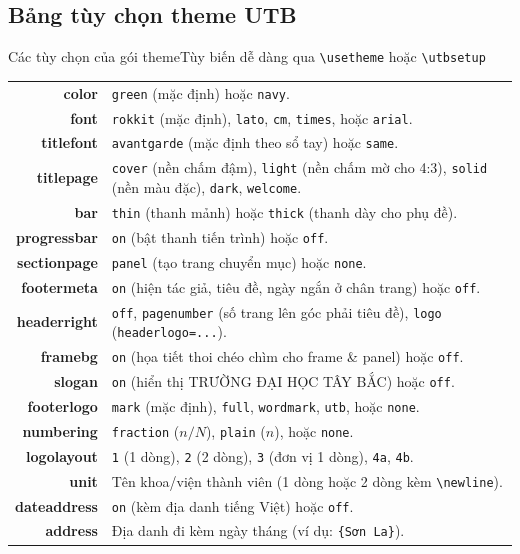 \documentclass[aspectratio=169,10pt]{beamer}
\begin{document}
\subsection{Bảng tùy chọn theme UTB}
\begin{frame}{Các tùy chọn của gói theme}{Tùy biến dễ dàng qua \texttt{\textbackslash usetheme} hoặc \texttt{\textbackslash utbsetup}}
  \scriptsize
  \centering
  \begin{tabularx}{\textwidth}{>{\ttfamily\bfseries\color{utbmain}}r >{\small}X}
    color       & \texttt{green} (mặc định) hoặc \texttt{navy}. \\
    font        & \texttt{rokkit} (mặc định), \texttt{lato}, \texttt{cm}, \texttt{times}, hoặc \texttt{arial}. \\
    titlefont   & \texttt{avantgarde} (mặc định theo sổ tay) hoặc \texttt{same}. \\
    titlepage   & \texttt{cover} (nền chấm đậm), \texttt{light} (nền chấm mờ cho 4:3), \texttt{solid} (nền màu đặc), \texttt{dark}, \texttt{welcome}. \\
    bar         & \texttt{thin} (thanh mảnh) hoặc \texttt{thick} (thanh dày cho phụ đề). \\
    progressbar & \texttt{on} (bật thanh tiến trình) hoặc \texttt{off}. \\
    sectionpage & \texttt{panel} (tạo trang chuyển mục) hoặc \texttt{none}. \\
    footermeta  & \texttt{on} (hiện tác giả, tiêu đề, ngày ngắn ở chân trang) hoặc \texttt{off}. \\
    headerright & \texttt{off}, \texttt{pagenumber} (số trang lên góc phải tiêu đề), \texttt{logo} (\texttt{headerlogo=...}). \\
    framebg     & \texttt{on} (họa tiết thoi chéo chìm cho frame \& panel) hoặc \texttt{off}. \\
    slogan      & \texttt{on} (hiển thị TRƯỜNG ĐẠI HỌC TÂY BẮC) hoặc \texttt{off}. \\
    footerlogo  & \texttt{mark} (mặc định), \texttt{full}, \texttt{wordmark}, \texttt{utb}, hoặc \texttt{none}. \\
    numbering   & \texttt{fraction} ($n/N$), \texttt{plain} ($n$), hoặc \texttt{none}. \\
    logolayout  & \texttt{1} (1 dòng), \texttt{2} (2 dòng), \texttt{3} (đơn vị 1 dòng), \texttt{4a}, \texttt{4b}. \\
    unit        & Tên khoa/viện thành viên (1 dòng hoặc 2 dòng kèm \texttt{\textbackslash newline}). \\
    dateaddress & \texttt{on} (kèm địa danh tiếng Việt) hoặc \texttt{off}. \\
    address     & Địa danh đi kèm ngày tháng (ví dụ: \texttt{\{Sơn La\}}). \\
  \end{tabularx}
\end{frame}
\end{document}
